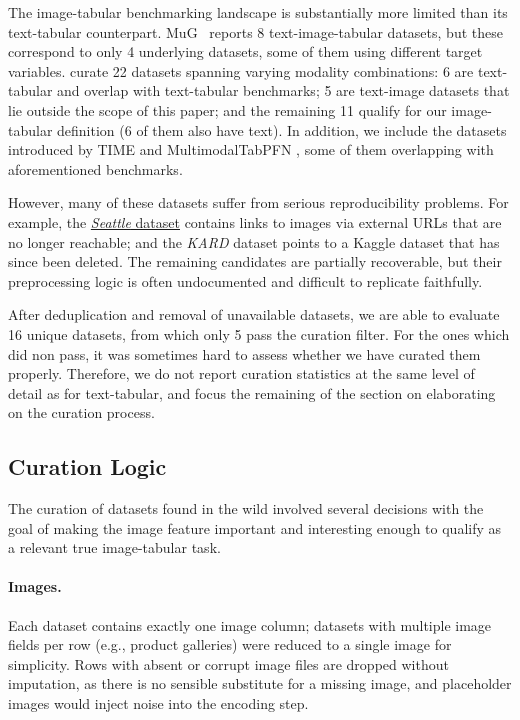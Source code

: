 \documentclass{llmxive}
\begin{document}
The image-tabular benchmarking landscape is substantially more limited than its text-tabular counterpart. MuG~\cite{lu_mug_2023} reports 8 text-image-tabular datasets, but these correspond to only 4 underlying datasets, some of them using different target variables. \citet{tang_bag_2024} curate 22 datasets spanning varying modality combinations: 6 are text-tabular and overlap with text-tabular benchmarks; 5 are text-image datasets that lie outside the scope of this paper; and the remaining 11 qualify for our image-tabular definition (6 of them also have text). In addition, we include the datasets introduced by TIME \cite{luo_time_2025} and MultimodalTabPFN \cite{kim_multimodalpfn_2025}, some of them overlapping with aforementioned benchmarks. 

However, many of these datasets suffer from serious reproducibility problems. For example, the \href{https://www.kaggle.com/datasets/airbnb/seattle}{\textit{Seattle} dataset} contains links to images via external URLs that are no longer reachable; and the \textit{KARD} dataset points to a Kaggle dataset that has since been deleted. The remaining candidates are partially recoverable, but their preprocessing logic is often undocumented and difficult to replicate faithfully. 

After deduplication and removal of unavailable datasets, we are able to evaluate 16 unique datasets, from which only 5 pass the curation filter. For the ones which did non pass, it was sometimes hard to assess whether we have curated them properly. Therefore, we do not report curation statistics at the same level of detail as for text-tabular, and focus the remaining of the section on elaborating on the curation process.

\subsection{Curation Logic}

The curation of datasets found in the wild involved several decisions with the goal of making the image feature important and interesting enough to qualify as a relevant true image-tabular task.

\paragraph{Images.}
Each dataset contains exactly one image column; datasets with multiple image fields per row (e.g., product galleries) were reduced to a single image for simplicity. Rows with absent or corrupt image files are dropped without imputation, as there is no sensible substitute for a missing image, and placeholder images would inject noise into the encoding step.
\end{document}
